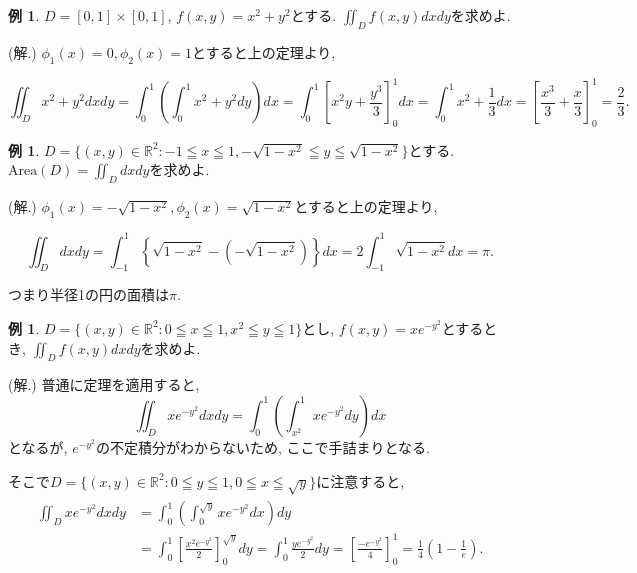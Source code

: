 \documentclass[dvipdfmx,a4paper,11pt]{article}
\newcommand{\R}{\mathbb{R}}
\newcommand{\Area}{\text{Area}}
\theoremstyle{definition}
\newtheorem{exa}[thm]{例}
\begin{document}
  \begin{exa}
 $D=[0,1]\times[0,1]$, $f(x,y)=x^2+y^2$とする.
 $\iint_{D}f(x,y)dxdy$を求めよ.

\hspace{-11pt}(解.) $\phi_1(x)=0, \phi_2(x)=1$とすると上の定理より, 

$$
\iint_{D}x^2+y^2dxdy 
  =  \int_{0}^{1}\left( \int_{0}^{1} x^2+y^2dy    \right) dx 
  = \int_{0}^{1}\left[ x^{2}y + \frac{y^3}{3}   \right]_{0}^{1} dx 
  =\int_{0}^{1} x^{2}+ \frac{1}{3}  dx 
  =\left[  \frac{x^3}{3} +\frac{x}{3}  \right]_{0}^{1} =\frac{2}{3}.
$$
 \end{exa}
 
   \begin{exa}
$D = \{ (x,y) \in \R^2 : -1 \leqq x \leqq 1, -\sqrt{1-x^2} \leqq y \leqq \sqrt{1-x^2} \}$とする.
$\Area(D) = \iint_{D} dxdy$を求めよ.

\hspace{-11pt}(解.) $\phi_1(x)=-\sqrt{1-x^2}, \phi_2(x)=\sqrt{1-x^2} $とすると上の定理より, 

$$
  \iint_{D}dxdy =\int_{-1}^{1} \left\{ \sqrt{1-x^2} - \left(-\sqrt{1-x^2} \right) \right\} dx
  = 2 \int_{-1}^{1} \sqrt{1-x^2} dx =\pi.
$$
  \end{exa}
つまり半径1の円の面積は$\pi$.
 
    \begin{exa}
$D = \{ (x,y) \in \R^2 : 0 \leqq x \leqq 1, x^2 \leqq y \leqq 1 \}$とし, 
$f(x,y)=xe^{-y^2}$とするとき,  $\iint_{D}f(x,y)dxdy$を求めよ.

\hspace{-11pt}(解.) 普通に定理を適用すると, 
$$
\iint_{D} xe^{-y^2}dxdy = \int_{0}^{1} \left( \int_{x^2}^{1} xe^{-y^2}dy    \right) dx
$$
となるが, $e^{-y^2}$の不定積分がわからないため, ここで手詰まりとなる.

そこで$D = \{ (x,y) \in \R^2 : 0 \leqq y \leqq 1, 0 \leqq x \leqq \sqrt{y} \}$に注意すると, 
\begin{align*}
\begin{split}
\iint_{D} xe^{-y^2}dxdy &= \int_{0}^{1} \left( \int_{0}^{\sqrt{y}} xe^{-y^2}dx   \right) dy \\
&= \int_{0}^{1}\left[ \frac{x^{2} e^{-y^2} }{2}  \right]_{0}^{\sqrt{y}} dy
=  \int_{0}^{1}    \frac{y e^{-y^2} }{2}      dy
= \left[  \frac{- e^{-y^2} }{4}   \right]_{0}^{1} = \frac{1}{4}\left( 1 - \frac{1}{e}\right).
\end{split}
\end{align*}

  \end{exa}
\end{document}
